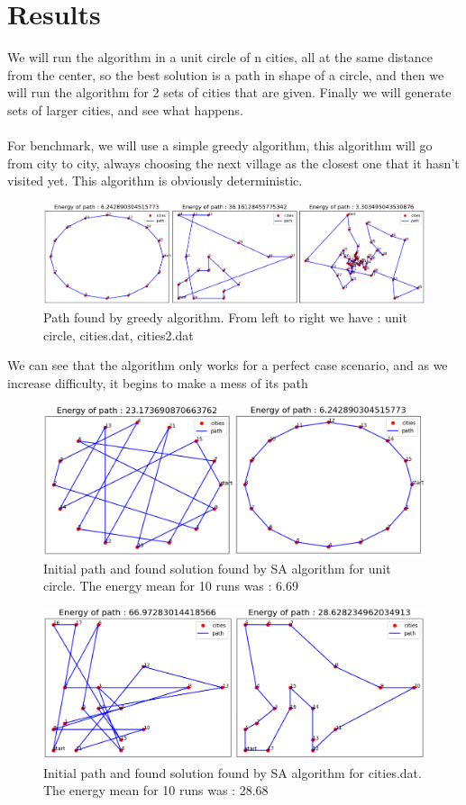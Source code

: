 \documentclass[a4paper]{article}
\begin{document}
\section{Results}
We will run the algorithm in a unit circle of n cities, all at the same distance from the center, so the best solution is a path in shape of a circle, and then we will run the algorithm for 2 sets of cities that are given. Finally we will generate sets of larger cities, and see what happens.\\\\
For benchmark, we will use a simple greedy algorithm, this algorithm will go from city to city, always choosing the next village as the closest one that it hasn't visited yet. This algorithm is obviously deterministic. 
\begin{figure}[H]
\center
\includegraphics[width=1\textwidth]{images/algorithm_greedy.PNG}
\caption{Path found by greedy algorithm. From left to right we have : unit circle, cities.dat, cities2.dat}
\end{figure}
We can see that the algorithm only works for a perfect case scenario, and as we increase difficulty, it begins to make a mess of its path
\begin{figure}[H]
\center
\includegraphics[width=1\textwidth]{images/algorithm_sa_circle.PNG}
\caption{Initial path and found solution found by SA algorithm for unit circle. The energy mean for 10 runs was : 6.69}
\end{figure}
\begin{figure}[H]
\center
\includegraphics[width=1\textwidth]{images/algorithm_sa_cities.PNG}
\caption{Initial path and found solution found by SA algorithm for cities.dat. The energy mean for 10 runs was : 28.68}
\end{figure}
\end{document}

